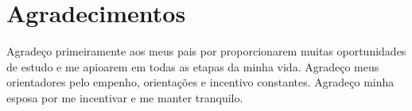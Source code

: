 \chapter*{Agradecimentos}
Agradeço primeiramente aos meus pais por proporcionarem muitas oportunidades de estudo e me apioarem em todas as etapas da minha vida. Agradeço meus orientadores pelo empenho, orientações e incentivo constantes. Agradeço minha esposa por me incentivar e me manter tranquilo.
